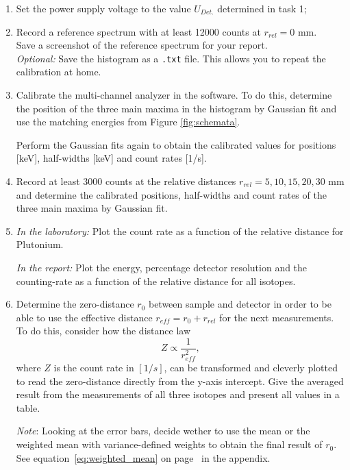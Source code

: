 \begin{enumerate}[label=\textbf{\alph*)}]
	\item Set the power supply voltage to the value $U_{Det.}$ determined in task 1;
	\item Record a reference spectrum with at least 12000 counts at $r_{rel} = 0$ mm.
		\\ Save a screenshot of the reference spectrum for your report.
		\\ \textit{Optional: } Save the histogram as a \texttt{.txt} file. This allows you to repeat the calibration at home.
	\item Calibrate the multi-channel analyzer in the software. To do this, determine the position of the three main maxima in the histogram by Gaussian fit and use the matching energies from Figure \ref{fig:schemata}. 
	
	Perform the Gaussian fits again to obtain the calibrated values for positions [keV], half-widths [keV] and count rates [1/s].
	\item Record at least 3000 counts at the relative distances $r_{rel} = 5, 10, 15, 20, 30$ mm and determine the calibrated positions, half-widths and count rates of the three main maxima by Gaussian fit.
	\item \textit{In the laboratory:} Plot the count rate as a function of the relative distance for Plutonium.
	
	\textit{In the report:} Plot the energy, percentage detector resolution and the counting-rate as a function of the relative distance for all isotopes.
	\item Determine the zero-distance $r_0$ between sample and detector in order to be able to use the effective distance $r_{eff} = r_0 + r_{rel}$ for the next measurements. To do this, consider how the distance law
	\begin{equation}
		Z \propto \frac{1}{r^2_{eff}},
	\end{equation}
	where $Z$ is the count rate in $[1/s]$, can be transformed and cleverly plotted to read the zero-distance directly from the y-axis intercept. Give the averaged result from the measurements of all three isotopes and present all values in a table.
 
    \textit{Note}: Looking at the error bars, decide wether to use the mean or the weighted mean with variance-defined weights to obtain the final result of $r_0$. See equation~\eqref{eq:weighted_mean} on page~\pageref{eq:weighted_mean} in the appendix.

\end{enumerate}
%
